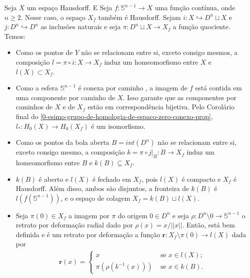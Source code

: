 Seja $X$ um espaço Hausdorff. E Seja $f:\mathbb{S}^{n-1}\rightarrow X$ uma função contínua, onde $n\ge 2$. Nesse caso, o espaço $X_f$ também é Hausdorff. Sejam $i:X\hookrightarrow D^n\sqcup X$ e $j:D^n\hookrightarrow D^n$ as inclusões naturais e seja $\pi:D^n\sqcup X\rightarrow X_f$ a função quociente. Temos:
\begin{itemize}
    \item Como os pontos de $Y$ não se relacionam entre si, exceto consigo mesmos, a composição $l=\pi\circ i:X\rightarrow X_f$ induz um homeomorfismo entre $X$ e $l(X)\subset X_f$.
    \item Como a esfera $\mathbb{S}^{n-1}$ é conexa por caminho , a imagem de $f$ está contida em uma componente por caminho de $X$. Isso garante que as componentes por caminhos de $X$ e de $X_f$ estão em correspondência bijetiva. Pelo Corolário final do \ref{0-esimo-grupo-de-homologia-de-espaco-zero-conexo-prop}, $l_*:H_0 (X)\rightarrow H_0(X_f)$ é um isomorfismo.
    \item Como os pontos da bola aberta $B=int(D^n)$ não se relacionam entre si, exceto consigo mesmo, a composição $k=\pi\circ j|_B: B\rightarrow X_f$ induz um homeomorfismo entre $B$ e $k(B)\subseteq X_f$.
    \item $k(B)$ é aberto e $l(X)$ é fechado em $X_f$, pois $l(X)$ é compacto e $X_f$ é Hausdorff. Além disso, ambos são disjuntos, a fronteira de $k(B)$ é $l(f(\mathbb{S}^{n-1}))$, e o espaço de colagem $X_f=k(B)\sqcup l(X)$.
    \item Seja $\pi(0)\in X_f$ a imagem por $\pi$ do origem $0\in D^n$ e seja $\rho: D^n\setminus 0\rightarrow \mathbb{S}^{n-1}$ o retrato por deformação radial dado por $\rho(x)=x/||x||$. Então, está bem definida e é um retrato por deformação a função $\mathbf{r}:X_f\setminus \pi(0)\rightarrow l(X)$ dada por 
    \begin{align*}
        \textbf{r}(x)=\begin{cases}
            x&\text{ se }x\in l(X);\\
            \pi(\rho(k^{-1}(x))) &\text{ se }x\in k(B).
        \end{cases}
    \end{align*}
\end{itemize}

